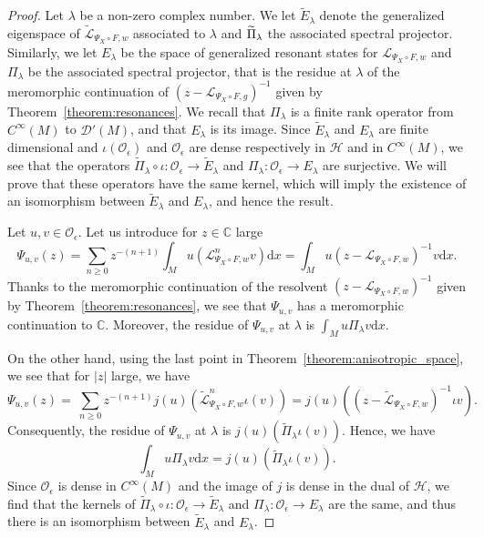 \documentclass[AHL,Unicode,longabstracts,published]{cedram}
\newcommand{\p}[1]{\left(#1\right)}
\newcommand{\clO}{\mathcal{O}}
\newcommand{\clL}{\mathcal{L}}
\newcommand{\clD}{\mathcal{D}}
\newcommand{\clH}{\mathcal{H}}
\newcommand{\bbC}{\mathbb{C}}
\newcommand{\rmd}{\mathrm{d}}
\let\oldtilde\tilde
\renewcommand*{\tilde}[1]{\mathchoice{\widetilde{#1}}{\widetilde{#1}}{\oldtilde{#1}}{\oldtilde{#1}}}
\newcommand{\clO}{\mathcal{O}}
\begin{document}
\begin{proof}
Let $\lambda$ be a non-zero complex number. We let $\widetilde{E}_\lambda$ denote the generalized eigenspace of $\widetilde{\clL}_{\Psi_X \circ F,w}$ associated to $\lambda$ and $\tilde{\Pi}_\lambda$ the associated spectral projector. Similarly, we let $E_\lambda$ be the space of generalized resonant states for $\clL_{\Psi_X \circ F,w}$ and $\Pi_\lambda$ be the associated spectral projector, that is the residue at $\lambda$ of the meromorphic continuation of $(z - \clL_{\Psi_X \circ F,g})^{-1}$ given by Theorem~\ref{theorem:resonances}. We recall that $\Pi_\lambda$ is a finite rank operator from $C^\infty(M)$ to $\clD'(M)$, and that $E_\lambda$ is its image. Since $\widetilde{E}_\lambda$ and $E_\lambda$ are finite dimensional and $\iota(\clO_\epsilon)$ and $\clO_\epsilon$ are dense respectively in $\clH$ and in $C^\infty(M)$, we see that the operators $\widetilde{\Pi}_\lambda \circ \iota : \clO_\epsilon \to \widetilde{E}_\lambda$ and $\Pi_\lambda : \clO_\epsilon \to E_\lambda$ are surjective. We will prove that these operators have the same kernel, which will imply the existence of an isomorphism between $\widetilde{E}_\lambda$ and $E_\lambda$, and hence the result.

Let $u,v \in \clO_\epsilon$. Let us introduce for $z \in \bbC$ large
\begin{equation*}
\Psi_{u,v}(z) = \sum_{n \geq 0} z^{-(n+1)} \int_M u \left(\clL_{\Psi_X \circ F,w}^n v\right) \rmd x = \int_{M} u \left(z - \clL_{\Psi_X \circ F,w}\right)^{-1} v \rmd x.
\end{equation*}
Thanks to the meromorphic continuation of the resolvent $(z - \clL_{\Psi_X \circ F,w})^{-1}$ given by Theorem~\ref{theorem:resonances}, we see that $\Psi_{u,v}$ has a meromorphic continuation to $\bbC$. Moreover, the residue of $\Psi_{u,v}$ at $\lambda$ is $\int_M u \Pi_\lambda v \rmd x$.

On the other hand, using the last point in Theorem~\ref{theorem:anisotropic_space}, we see that for $|z|$ large, we have
\begin{equation*}
\Psi_{u,v}(z) = \ \sum_{n \geq 0} z^{-(n+1)} j(u)\p{\widetilde{\clL}_{\Psi_X \circ F,w}^n \iota(v)} = j(u)\p{\left(z - \widetilde{\clL}_{\Psi_X \circ F,w}\right)^{-1} \iota v}.
\end{equation*}
Consequently, the residue of $\Psi_{u,v}$ at $\lambda$ is $j(u)\p{\widetilde{\Pi}_\lambda \iota(v)}$. Hence, we have
\begin{equation*}
\int_M u \Pi_\lambda v \rmd x = j(u)\p{\widetilde{\Pi}_\lambda \iota(v)}.
\end{equation*}
Since $\clO_\epsilon$ is dense in $C^\infty(M)$ and the image of $j$ is dense in the dual of $\clH$, we find that the kernels of $\widetilde{\Pi}_\lambda \circ \iota : \clO_\epsilon \to \widetilde{E}_\lambda$ and $\Pi_\lambda : \clO_\epsilon \to E_\lambda$ are the same, and thus there is an isomorphism between $\widetilde{E}_\lambda$ and $E_\lambda$.
\end{proof}
\end{document}
